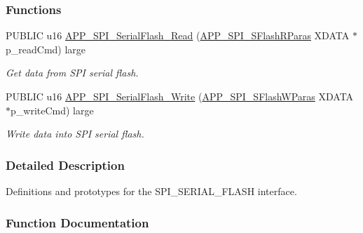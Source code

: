 \subsubsection*{Functions}
\begin{DoxyCompactItemize}
\item 
P\+U\+B\+L\+IC u16 \hyperlink{group___s_p_i___s_e_r_i_a_l___f_l_a_s_h_ga8835965d31a4d26fa01dcde8ddacc886}{A\+P\+P\+\_\+\+S\+P\+I\+\_\+\+Serial\+Flash\+\_\+\+Read} (\hyperlink{struct_a_p_p___s_p_i___s_flash_r_paras}{A\+P\+P\+\_\+\+S\+P\+I\+\_\+\+S\+Flash\+R\+Paras} X\+D\+A\+TA $\ast$p\+\_\+read\+Cmd) large
\begin{DoxyCompactList}\small\item\em Get data from S\+PI serial flash. \end{DoxyCompactList}\item 
P\+U\+B\+L\+IC u16 \hyperlink{group___s_p_i___s_e_r_i_a_l___f_l_a_s_h_ga5826c2cf011bddfeb49ff7e3b98ace34}{A\+P\+P\+\_\+\+S\+P\+I\+\_\+\+Serial\+Flash\+\_\+\+Write} (\hyperlink{struct_a_p_p___s_p_i___s_flash_w_paras}{A\+P\+P\+\_\+\+S\+P\+I\+\_\+\+S\+Flash\+W\+Paras} X\+D\+A\+TA $\ast$p\+\_\+write\+Cmd) large
\begin{DoxyCompactList}\small\item\em Write data into S\+PI serial flash. \end{DoxyCompactList}\end{DoxyCompactItemize}


\subsubsection{Detailed Description}
Definitions and prototypes for the S\+P\+I\+\_\+\+S\+E\+R\+I\+A\+L\+\_\+\+F\+L\+A\+SH interface. 



\subsubsection{Function Documentation}
